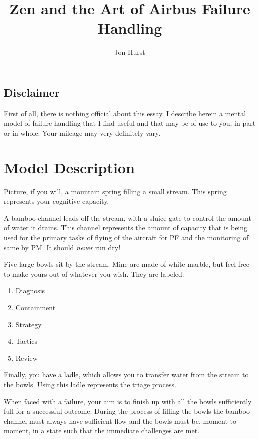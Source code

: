 \documentclass[a5paper,11pt,titlepage]{article}
\title{Zen and the Art of Airbus Failure Handling}
\author{Jon Hurst}
\begin{document}
\maketitle

\begin{tcolorbox}[colframe=red]
\section*{Disclaimer}

First of all, there is nothing official about this essay. I describe
herein a mental model of failure handling that I find useful and that
may be of use to you, in part or in whole. Your mileage may very
definitely vary.

\end{tcolorbox}

\section{Model Description}

Picture, if you will, a mountain spring filling a small stream. This
spring represents your cognitive capacity.

A bamboo channel leads off the stream, with a sluice gate to control the
amount of water it drains. This channel represents the amount of
capacity that is being used for the primary tasks of flying of the
aircraft for PF and the monitoring of same by PM. It should \emph{never}
run dry!

Five large bowls sit by the stream. Mine are made of white marble, but
feel free to make yours out of whatever you wish. They are labeled:

\begin{enumerate}
\item Diagnosis
\item Containment
\item Strategy
\item Tactics
\item Review
\end{enumerate}

Finally, you have a ladle, which allows you to transfer water from the
stream to the bowls. Using this ladle represents the triage process.

When faced with a failure, your aim is to finish up with all the bowls
sufficiently full for a successful outcome. During the process of
filling the bowls the bamboo channel must always have sufficient
flow and the bowls must be, moment to moment, in a state such that the
immediate challenges are met.
\end{document}
